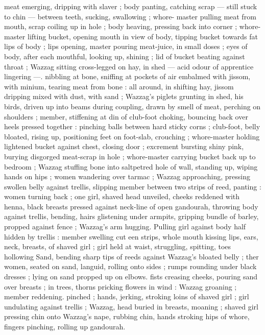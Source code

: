 meat emerging, dripping with slaver ; body panting, catching scrap 
--- still stuck to chin --- between teeth, sucking, swallowing ; whore- 
master pulling meat from mouth, scrap coiling up in hole ; body 
heaving, pressing back into corner ; whore-master lifting bucket, 
opening mouth in view of body, tipping bucket towards fat lips of 
body ; lips opening, master pouring meat-juice, in small doses ; eyes 
of body, after each mouthful, looking up, shining ; lid of bucket 
beating against throat ; Wazzag sitting cross-legged on hay, in shed 
--- acid odour of apprentice lingering ---. nibbling at bone, sniffing 
at pockets of air embalmed with jissom, with minium, tearing meat 
from bone : all around, in shifting hay, jissom dripping mixed with 
dust, with sand ; Wazzag's piglets grunting in shed, his birds, driven 
up into beams during coupling, drawn by smell of meat, perching on 
shoulders ; member, stiffening at din of club-foot choking, bouncing 
back over heels pressed together : pinching balls between hard 
sticky corns ; club-foot, belly bloated, rising up, positioning feet on 
foot-slab, crouching ; whore-master holding lightened bucket against 
chest, closing door ; excrement bursting shiny pink, burying 
disgorged meat-scrap in hole ; whore-master carrying bucket back 
up to bedroom ; Wazzag stuffing bone into saltpetred hole of wall, 
standing up, wiping hands on hips ; women wandering over tarmac ; 
Wazzag approaching, pressing swollen belly against trellis, slipping 
member between two strips of reed, panting : women turning back ; 
one girl, shaved head unveiled, cheeks reddened with henna, black 
breasts pressed against neck-line of open gandourah, throwing body 
against trellis, bending, hairs glistening under armpits, gripping 
bundle of barley, propped against fence ; Wazzag's arm hugging. 
Pulling girl against body half hidden by trellis : member swelling cut 
een strips, whole mouth kissing lips, ears, neck, breasts, of 
shaved girl ; girl held at waist, struggling, spitting, toes hollowing 
Sand, bending sharp tips of reeds against Wazzag's bloated belly ; 
ther women, seated on sand, languid, rolling onto sides ; rumps 
rounding under black dresses ; lying on sand propped up on elbows. 
fists creasing cheeks, pouring sand over breasts ; in trees, thorns 
pricking flowers in wind : Wazzag groaning ; member reddening. 
pinched ; hands, jerking, stroking loins of shaved girl ; girl 
undulating against trellis ; Wazzag, head buried in breasts, moaning 
; shaved girl pressing chin onto Wazzag's nape, rubbing chin, hands 
stroking hips of whore, fingers pinching, rolling up gandourah. 
